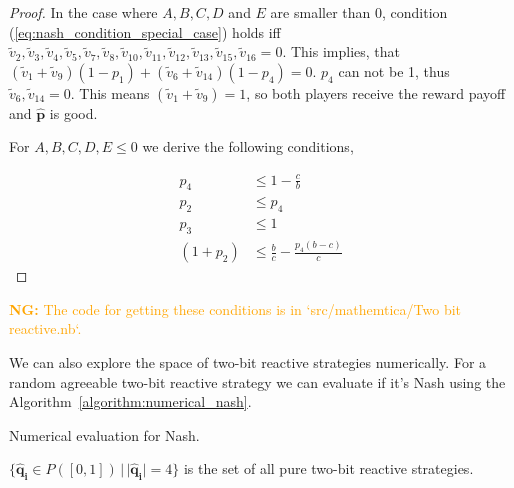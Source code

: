\documentclass{article}
\theoremstyle{definition}
\newcommand{\nikoleta}[1]{\textcolor{orange}{{\bf NG:} #1}}
\begin{document}
\begin{proof}
In the case where \(A, B, C, D\) and \(E\) are smaller than 0, condition
(\ref{eq:nash_condition_special_case}) holds iff \(\tilde{v}_2, \tilde{v}_3,
\tilde{v}_4, \tilde{v}_5, \tilde{v}_7, \tilde{v}_8, \tilde{v}_{10},
\tilde{v}_{11}, \tilde{v}_{12}, \tilde{v}_{13}, \tilde{v}_{15}, \tilde{v}_{16} =
0\). This implies, that \((\tilde{v}_1 + \tilde{v}_9) (1 - p_1) + (\tilde{v}_6 +
\tilde{v}_{14}) (1 - p_4) = 0\). \(p_4\) can not be 1, thus \(\tilde{v}_6,
\tilde{v}_{14} = 0\). This means \((\tilde{v}_1 + \tilde{v}_9) = 1\), so both
players receive the reward payoff and \(\mathbf{\hat{p}}\) is good.

For \(A, B, C, D, E \leq 0\) we derive the following conditions,

\begin{align}\label{eq:nash_conditions}
  p_4       & \leq 1 - \frac{c}{b} \\
  p_2       & \leq p_4 \\
  p_3       & \leq 1 \\
  (1 + p_2) & \leq \frac{b}{c} - \frac{p_4 (b - c)}{c}
\end{align}

\end{proof}

\nikoleta{The code for getting these conditions is in `src/mathemtica/Two bit reactive.nb`.}

We can also explore the space of two-bit reactive strategies numerically. For a
random agreeable two-bit reactive strategy we can evaluate if it's Nash using
the Algorithm~\ref{algorithm:numerical_nash}.

\begin{algorithm}[H]
  \SetAlgoLined {}
  \caption{Numerical evaluation for Nash.}\label{algorithm:numerical_nash}
\end{algorithm}

\(\{\mathbf{\hat{q}_i} \in P([0, 1]) \,|\, |\mathbf{\hat{q}_i}| = 4 \}\) is
the set of all pure two-bit reactive strategies.
\end{document}
